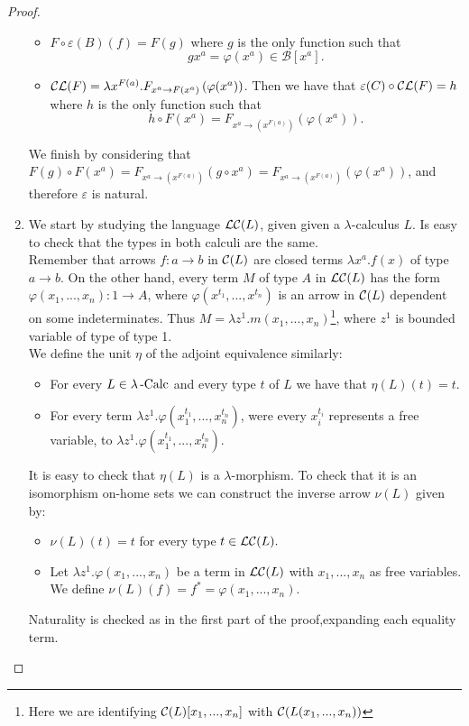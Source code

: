 \begin{proof}
\begin{enumerate}
    \begin{itemize}
    \item  $F \circ \varepsilon(B)(f) = F(g)$ where $g$ is the only function  such that$$gx^a = \varphi(x^a) \in \mathcal B[x^a].$$
    \item $\mathcal{C}\mathcal{L}(F) = \lambda x^{F(a)}.F_{x^a\to F(x^a)} \left ( \varphi(x^a)\right )$. Then we have that $\varepsilon(C)\circ \mathcal{C}\mathcal{L}(F) = h$ where $h$ is the only function such that $$h\circ F(x^a) = F_{x^a\to (x^{F(a)})}\left ( \varphi(x^a)\right ).$$
    \end{itemize}
    We finish by considering that $F(g)\circ F(x^a) = F_{x^a\to (x^{F(a)})}(g \circ x^a) = F_{x^a\to (x^{F(a)})}(\varphi(x^a)) $, and therefore $\varepsilon$ is natural.\\

  \item[\fbox{$ 1_{\mathcal A}\cong \LL \CC $}] We start by studying the language $\mathcal{L}\mathcal{C}(L)$, given given a $\lambda$-calculus $L$. Is easy to check that the types in both calculi are the same.\\

    Remember that arrows $f:a\to b$ in $\mathcal{C}(L)$ are closed terms $\lambda x^a.f(x)$ of type $a\to b$. On the other hand, every term $M$ of type $A$ in $\mathcal{L}\mathcal{C}(L)$ has the form $\varphi(x_1,...,x_n): 1 \to A$, where $\varphi(x^{t_1},...,x^{t_n})$ is an arrow in $\mathcal{C}(L)$ dependent on some indeterminates. Thus $M =\lambda z^1.m(x_1,...,x_n)$\footnote{Here we are identifying $\mathcal{C}(L)[x_1,...,x_n]$ with $\mathcal{C}(L(x_1,...,x_n))$}, where $z^1$ is bounded variable of type of type 1.\\


    We define the unit $\eta$ of the adjoint equivalence similarly:
    \begin{itemize}
    \item For every $L\in \lambda\operatorname{-Calc}$ and every type $t$ of $L$ we have that $\eta(L)(t) = t$.
    \item For every term $\lambda z^1.\varphi (x_1^{t_1},...,x_n^{t_n})$, were every $x_i^{t_i}$ represents a free variable, to $\lambda z^1. \varphi (x_1^{t_1},...,x_n^{t_n}).$
    \end{itemize}


    It is easy to check that $\eta(L)$ is a $\lambda$-morphism. To check that it is an isomorphism on-home sets we can construct the inverse arrow $\nu(L)$ given by:

    \begin{itemize}
    \item  $\nu(L)(t) = t$ for every type $t \in \mathcal{L}\mathcal{C}(L).$
    \item  Let $\lambda z^1.\varphi(x_1,...,x_n)$ be a term in $\mathcal{L}\mathcal{C}(L)$ with $x_1,...,x_n$ as free variables. We define $\nu(L)(f)= f^* = \varphi(x_1,...,x_n)$.  
    \end{itemize}

    Naturality is checked as in the first part of the proof,expanding each equality term.
  \end{enumerate}
\end{proof}


